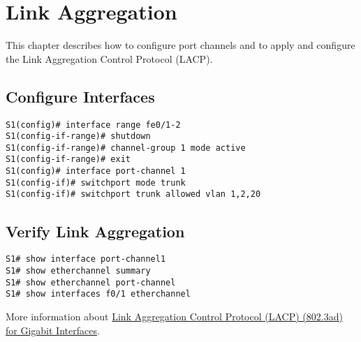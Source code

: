 \section{Link Aggregation}
This chapter describes how to configure port channels and to apply and configure the Link Aggregation Control Protocol (LACP).
\subsection{Configure Interfaces}
\begin{verbatim}
S1(config)# interface range fe0/1-2
S1(config-if-range)# shutdown
S1(config-if-range)# channel-group 1 mode active
S1(config-if-range)# exit
S1(config)# interface port-channel 1
S1(config-if)# switchport mode trunk
S1(config-if)# switchport trunk allowed vlan 1,2,20
\end{verbatim}

\subsection{Verify Link Aggregation}
\begin{verbatim}
S1# show interface port-channel1
S1# show etherchannel summary
S1# show etherchannel port-channel
S1# show interfaces f0/1 etherchannel
\end{verbatim}

More information about \href{https://www.cisco.com/c/en/us/td/docs/ios/12_2sb/feature/guide/gigeth.html}{Link Aggregation Control Protocol (LACP) (802.3ad) for Gigabit Interfaces}.
